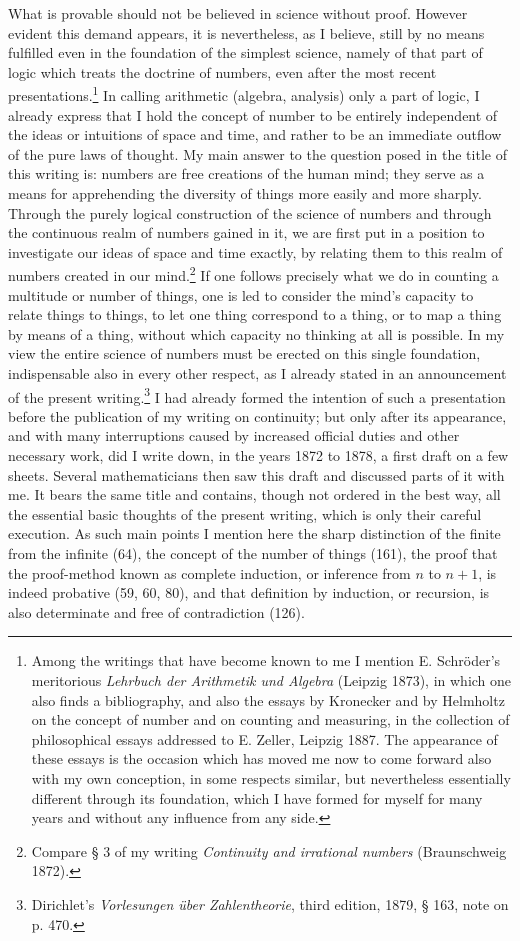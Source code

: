 \documentclass[11pt]{article}
\begin{document}
What is provable should not be believed in science without proof. However evident this demand appears, it is nevertheless, as I believe, still by no means fulfilled even in the foundation of the simplest science, namely of that part of logic which treats the doctrine of numbers, even after the most recent presentations.\footnote{Among the writings that have become known to me I mention E. Schröder's meritorious \emph{Lehrbuch der Arithmetik und Algebra} (Leipzig 1873), in which one also finds a bibliography, and also the essays by Kronecker and by Helmholtz on the concept of number and on counting and measuring, in the collection of philosophical essays addressed to E. Zeller, Leipzig 1887. The appearance of these essays is the occasion which has moved me now to come forward also with my own conception, in some respects similar, but nevertheless essentially different through its foundation, which I have formed for myself for many years and without any influence from any side.} In calling arithmetic (algebra, analysis) only a part of logic, I already express that I hold the concept of number to be entirely independent of the ideas or intuitions of space and time, and rather to be an immediate outflow of the pure laws of thought. My main answer to the question posed in the title of this writing is: numbers are free creations of the human mind; they serve as a means for apprehending the diversity of things more easily and more sharply. Through the purely logical construction of the science of numbers and through the continuous realm of numbers gained in it, we are first put in a position to investigate our ideas of space and time exactly, by relating them to this realm of numbers created in our mind.\footnote{Compare § 3 of my writing \emph{Continuity and irrational numbers} (Braunschweig 1872).} If one follows precisely what we do in counting a multitude or number of things, one is led to consider the mind's capacity to relate things to things, to let one thing correspond to a thing, or to map a thing by means of a thing, without which capacity no thinking at all is possible. In my view the entire science of numbers must be erected on this single foundation, indispensable also in every other respect, as I already stated in an announcement of the present writing.\footnote{Dirichlet's \emph{Vorlesungen über Zahlentheorie}, third edition, 1879, § 163, note on p. 470.} I had already formed the intention of such a presentation before the publication of my writing on continuity; but only after its appearance, and with many interruptions caused by increased official duties and other necessary work, did I write down, in the years 1872 to 1878, a first draft on a few sheets. Several mathematicians then saw this draft and discussed parts of it with me. It bears the same title and contains, though not ordered in the best way, all the essential basic thoughts of the present writing, which is only their careful execution. As such main points I mention here the sharp distinction of the finite from the infinite (64), the concept of the number of things (161), the proof that the proof-method known as complete induction, or inference from $n$ to $n+1$, is indeed probative (59, 60, 80), and that definition by induction, or recursion, is also determinate and free of contradiction (126).
\end{document}
